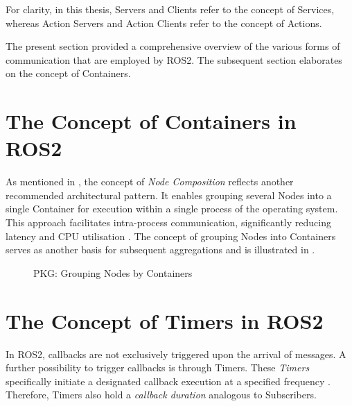     For clarity, in this thesis, \glqq{}Servers\grqq{} and \glqq{}Clients\grqq{} refer to the concept of Services, whereas \glqq{}Action Servers\grqq{} and \glqq{}Action Clients\grqq{} refer to the concept of Actions.

The present section provided a comprehensive overview of the various forms of communication that are employed by ROS2. The subsequent section elaborates on the concept of Containers.
\vspace{-.25cm}
\section{The Concept of Containers in ROS2} \label{sec:model:containers}
\vspace{-.25cm}
    As mentioned in , the concept of \emph{Node Composition} reflects another recommended architectural pattern. It enables grouping several Nodes into a single Container for execution within a single process of the operating system. This approach facilitates intra-process communication, significantly reducing latency and CPU utilisation \cite[p.~6f]{ROS2usesInTheWild}.
    The concept of grouping Nodes into Containers serves as another basis for subsequent aggregations and is illustrated in .
\enlargethispage{2\baselineskip}
    \begin{figure}[h]
        \centering
        
        \caption[Grouping Nodes by Containers]{PKG: Grouping Nodes by Containers} \label{fig:tikz:PKG:Containers}
    \end{figure}


\section{The Concept of Timers in ROS2} \label{sec:model:timers}
    In ROS2, callbacks are not exclusively triggered upon the arrival of messages. A further possibility to trigger callbacks is through Timers. These \emph{Timers} specifically initiate a designated callback execution at a specified frequency \cite[p.~213]{multiExecutor}\cite{website:Jazzy:ros2Executors}. Therefore, Timers also hold a \emph{callback duration} analogous to Subscribers.

